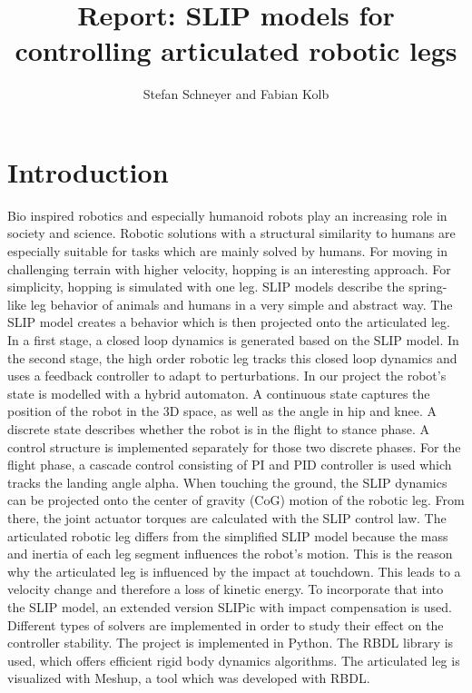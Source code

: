 \documentclass[10pt,conference]{IEEEtran}
\title{\LARGE \bf
Report: SLIP models for controlling articulated robotic legs
}
\author{Stefan Schneyer and Fabian Kolb}
\begin{document}
\maketitle
\thispagestyle{empty}
\pagestyle{empty}



\section{Introduction}
\label{sec:Introduction}


Bio inspired robotics and especially humanoid robots play an increasing role in society and science. Robotic solutions with a structural 
similarity to humans are especially suitable for tasks which are mainly solved by humans. For moving in challenging terrain with higher velocity,
hopping is an interesting approach. For simplicity, hopping is simulated with one leg. SLIP models describe the spring-like leg behavior
of animals and humans in a very simple and abstract way. The SLIP model creates a behavior which is then projected onto the articulated leg. 
In a first stage, a closed loop dynamics is generated based on the SLIP model. In the second stage, the high order robotic leg tracks this closed loop dynamics 
and uses a feedback controller to adapt to perturbations. In our project the robot's state is modelled with a hybrid automaton. 
A continuous state captures the position of the robot in the 3D space, as well as the angle in hip and knee. A discrete state describes whether the robot is 
in the flight to stance phase. A control structure is implemented separately for those two discrete phases. 
For the flight phase, a cascade control consisting of PI and PID controller is used which tracks the landing angle alpha. When touching the ground, the SLIP dynamics 
can be projected onto the center of gravity (CoG) motion of the robotic leg. From there, the joint actuator torques are calculated with the SLIP control law. The articulated robotic leg 
differs from the simplified SLIP model because the mass and inertia of each leg segment influences the robot's motion. This is the reason why the articulated 
leg is influenced by the impact at touchdown. This leads to a velocity change and therefore a loss of kinetic energy. To incorporate that into the SLIP model, an extended 
version SLIPic with impact compensation is used. Different types of solvers are implemented in order to study their effect on the controller stability. 
The project is implemented in Python. The RBDL library is used, which offers efficient rigid body dynamics algorithms. The articulated leg is visualized with Meshup, 
a tool which was developed with RBDL.
\end{document}
